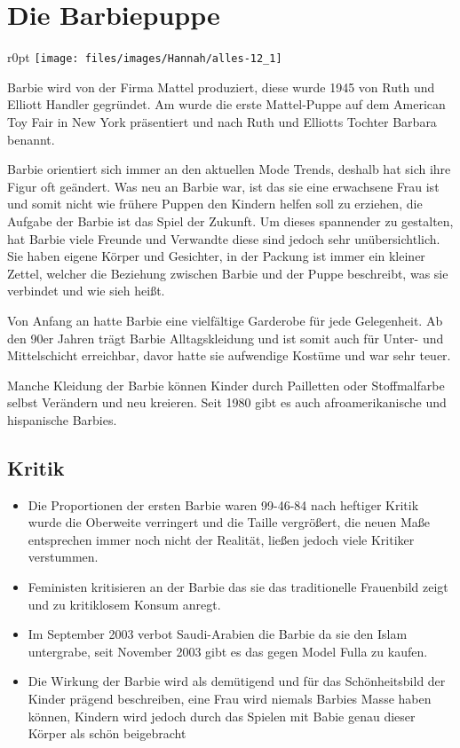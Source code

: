 \newpage
\section{Die Barbiepuppe}

\begin{wrapfigure}{r}{0pt}
	\texttt{[image: files/images/Hannah/alles-12\_1]}%
\end{wrapfigure}
Barbie wird von der Firma Mattel produziert, diese wurde 1945 von Ruth und Elliott Handler gegründet.
Am  wurde die erste Mattel-Puppe auf dem American Toy Fair in New York
präsentiert und nach Ruth und Elliotts Tochter Barbara benannt.

Barbie orientiert sich immer an den aktuellen Mode Trends, deshalb hat sich ihre Figur oft geändert.
Was neu an Barbie war, ist das sie eine erwachsene Frau ist und somit nicht wie frühere Puppen den
Kindern helfen soll zu erziehen, die Aufgabe der Barbie ist das Spiel der Zukunft. Um dieses
spannender zu gestalten, hat Barbie viele Freunde und Verwandte diese sind jedoch sehr
unübersichtlich. Sie haben eigene Körper und Gesichter, in der Packung ist immer ein kleiner Zettel,
welcher die Beziehung zwischen Barbie und der Puppe beschreibt, was sie verbindet und wie sieh heißt.

Von Anfang an hatte Barbie eine vielfältige Garderobe für jede Gelegenheit. Ab den 90er Jahren trägt
Barbie Alltagskleidung und ist somit auch für Unter- und Mittelschicht erreichbar, davor hatte sie
aufwendige Kostüme und war sehr teuer.

Manche Kleidung der Barbie können Kinder durch Pailletten oder Stoffmalfarbe selbst Verändern und neu
kreieren. Seit 1980 gibt es auch afroamerikanische und hispanische Barbies.

\subsection{Kritik}
\begin{itemize}
	\item Die Proportionen der ersten Barbie waren 99-46-84 nach heftiger Kritik wurde die
		Oberweite verringert und die Taille vergrößert, die neuen Maße entsprechen immer noch
		nicht der Realität, ließen jedoch viele Kritiker verstummen.
	\item Feministen kritisieren an der Barbie das sie das traditionelle Frauenbild zeigt und zu
		kritiklosem Konsum anregt.
	\item Im September 2003 verbot Saudi-Arabien die Barbie da sie den Islam untergrabe, seit
		November 2003 gibt es das gegen Model Fulla zu kaufen.
	\item Die Wirkung der Barbie wird als demütigend und für das Schönheitsbild der Kinder prägend
		beschreiben, eine Frau wird niemals Barbies Masse haben können, Kindern wird jedoch durch das
		Spielen mit Babie genau dieser Körper als schön beigebracht
\end{itemize}

